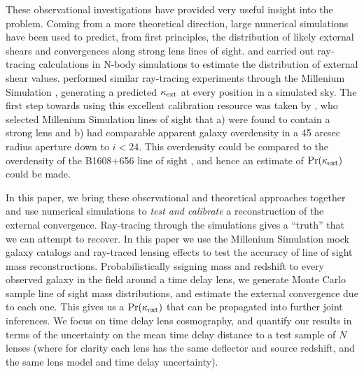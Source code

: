 \documentclass[useAMS,usenatbib]{mn2e}
\begin{document}
These observational investigations have provided very useful insight into the
problem.  Coming from a more theoretical direction, large numerical
simulations have been used to predict, from first principles, the distribution
of likely external shears and convergences along strong lens lines of sight. 
\citet{Holder+Schechter2003} and \citet{Dalal+Watson2004} carried out
ray-tracing calculations in N-body simulations to estimate the  distribution
of external shear values.  \citet{HilbertEtal2009} performed similar ray-tracing
experiments through the Millenium Simulation \citep{SpringelEtal2005},
generating a predicted $\kappa_{\rm ext}$ at every position in a simulated sky. The
first step towards using this excellent calibration resource was taken by
\citet{SuyuEtal2010}, who selected Millenium Simulation lines of sight that a)
were found to contain a strong lens and b) had comparable apparent galaxy
overdensity in a 45 arcsec radius aperture down to $i < 24$. This overdensity
could be compared to the overdensity of the B1608$+$656 line of sight
\citep{FassnachtEtal2011}, and hence an estimate of  ${\rm Pr}(\kappa_{\rm ext})$ could be
made. 

In this paper, we bring these observational and theoretical approaches
together and  use numerical simulations to {\it test and calibrate} a
reconstruction of the  external convergence. Ray-tracing through the
simulations gives a ``truth'' that we can attempt to recover.  In this paper
we use the Millenium Simulation mock galaxy catalogs and ray-traced lensing
effects to test the accuracy of line of sight mass reconstructions.
Probabilistically ssigning mass and redshift to every observed galaxy in the
field around a time delay lens, we generate Monte Carlo sample line of sight
mass distributions, and estimate the external convergence due to each one.
This gives us a ${\rm Pr}(\kappa_{\rm ext})$ that can be propagated into further joint
inferences. We focus on time delay lens cosmography, and quantify our results
in terms of the uncertainty on the mean time delay distance to a test sample
of $N$ lenses (where for clarity each lens has the same deflector and source
redshift, and the same lens model and time delay uncertainty).
\end{document}
